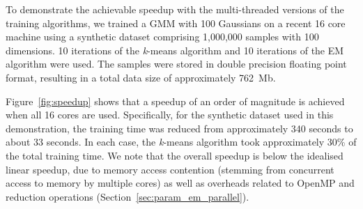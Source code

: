 
To demonstrate the achievable speedup with the multi-threaded versions of the training algorithms,
we trained a GMM with 100 Gaussians on a recent 16 core machine using a synthetic dataset comprising 1,000,000 samples with 100 dimensions.
10 iterations of the {\it k}-means algorithm and 10 iterations of the EM algorithm were used.
The samples were stored in double precision floating point format, resulting in a total data size of approximately 762~Mb.

Figure~\ref{fig:speedup} shows that a speedup of an order of magnitude is achieved when all 16 cores are used.
Specifically, for the synthetic dataset used in this demonstration,
the training time was reduced from approximately 340 seconds to about 33 seconds.
In each case, the {\it k}-means algorithm took approximately 30\% of the total training time.
We note that the overall speedup is below the idealised linear speedup,
due to memory access contention (stemming from concurrent access to memory by multiple cores)
as well as overheads related to OpenMP and reduction operations (Section~\ref{sec:param_em_parallel}).

